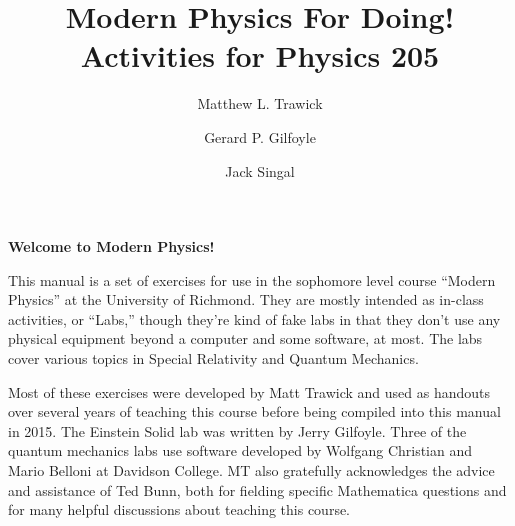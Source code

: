 

\title{Modern Physics For Doing!\\
Activities for Physics 205}

\author{Matthew L. Trawick}
\author{Gerard P. Gilfoyle}
\author{Jack Singal}

\maketitle

\vspace{0.8 in}


\begin{center}
\large{\textbf{Welcome to Modern Physics!}}
\end{center}


This manual is a set of exercises for use in the sophomore level course ``Modern Physics'' at the University of Richmond.  They are mostly intended as in-class activities, or ``Labs,'' though they’re kind of fake labs in that they don't use any physical equipment beyond a computer and some software, at most.  The labs cover various topics in Special Relativity and Quantum Mechanics.

Most of these exercises were developed by Matt Trawick and used as handouts over several years of teaching this course before being compiled into this manual in 2015.  The Einstein Solid lab was written by Jerry Gilfoyle.  Three of the quantum mechanics labs use software developed by Wolfgang Christian and Mario Belloni at Davidson College.  MT also gratefully acknowledges the advice and assistance of Ted Bunn, both for fielding specific Mathematica questions and for many helpful discussions about teaching this course.



\newpage
\
\thispagestyle{plain}

\newpage
\
